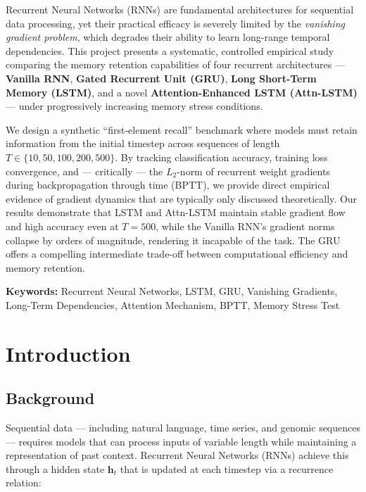 \documentclass[12pt, a4paper]{article}
\begin{document}
Recurrent Neural Networks (RNNs) are fundamental architectures for sequential data processing, yet their practical efficacy is severely limited by the \textit{vanishing gradient problem}, which degrades their ability to learn long-range temporal dependencies. This project presents a systematic, controlled empirical study comparing the memory retention capabilities of four recurrent architectures — \textbf{Vanilla RNN}, \textbf{Gated Recurrent Unit (GRU)}, \textbf{Long Short-Term Memory (LSTM)}, and a novel \textbf{Attention-Enhanced LSTM (Attn-LSTM)} — under progressively increasing memory stress conditions.

We design a synthetic ``first-element recall'' benchmark where models must retain information from the initial timestep across sequences of length $T \in \{10, 50, 100, 200, 500\}$. By tracking classification accuracy, training loss convergence, and — critically — the $L_2$-norm of recurrent weight gradients during backpropagation through time (BPTT), we provide direct empirical evidence of gradient dynamics that are typically only discussed theoretically. Our results demonstrate that LSTM and Attn-LSTM maintain stable gradient flow and high accuracy even at $T=500$, while the Vanilla RNN's gradient norms collapse by orders of magnitude, rendering it incapable of the task. The GRU offers a compelling intermediate trade-off between computational efficiency and memory retention.

\textbf{Keywords:} Recurrent Neural Networks, LSTM, GRU, Vanishing Gradients, Long-Term Dependencies, Attention Mechanism, BPTT, Memory Stress Test

\section{Introduction}

\subsection{Background}

Sequential data — including natural language, time series, and genomic sequences — requires models that can process inputs of variable length while maintaining a representation of past context. Recurrent Neural Networks (RNNs) \cite{elman1990} achieve this through a hidden state $\mathbf{h}_t$ that is updated at each timestep via a recurrence relation:
\end{document}
